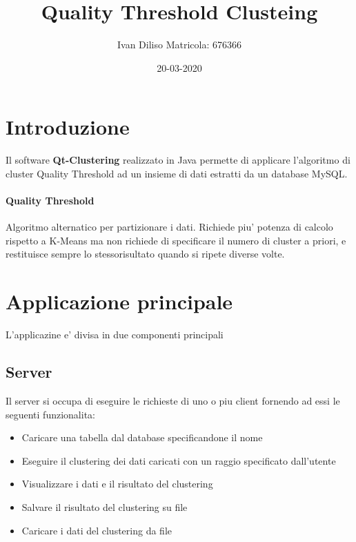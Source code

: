 \documentclass{article}
\title{Quality Threshold Clusteing}
\date{20-03-2020}
\author{Ivan Diliso Matricola: 676366}
\begin{document}
    \maketitle
    \section{Introduzione}
    Il software \textbf{Qt-Clustering} realizzato in Java permette di applicare 
    l'algoritmo di cluster Quality Threshold ad un insieme di dati estratti da 
    un database MySQL. 

    \paragraph{Quality Threshold} 
    Algoritmo alternatico per partizionare i dati. Richiede piu' potenza di
    calcolo rispetto a K-Means ma non richiede di specificare il numero di
    cluster a priori, e restituisce sempre lo stessorisultato quando si ripete
    diverse volte.
 
    \section{Applicazione principale}
    L'applicazine e' divisa in due componenti principali
        \subsection{Server}
        Il server si occupa di eseguire le richieste di uno o piu client
        fornendo ad essi le seguenti funzionalita:
            \begin{itemize}
                \item Caricare una tabella dal database specificandone il nome
                \item Eseguire il clustering dei dati caricati con un raggio
                specificato dall'utente
                \item Visualizzare i dati e il risultato del clustering
                \item Salvare il risultato del clustering su file
                \item Caricare i dati del clustering da file
            \end{itemize}
        
        
\end{document}
